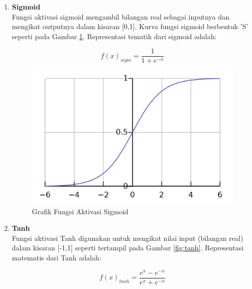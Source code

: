 \begin{enumerate}
	\item \textbf{Sigmoid}\\
	Fungsi aktivasi sigmoid mengambil bilangan real sebagai inputnya dan mengikat outputnya dalam kisaran [0,1]. Kurva fungsi sigmoid berbentuk 'S' seperti pada Gambar \ref{fig:sigmoid}. Representasi tematik dari sigmoid adalah:
	
	\begin{equation}
		f(x)_{sigm}=\frac{1}{1+e^{-x}}
	\end{equation}
	
	\begin{figure}[h!]
		\centering
		\includegraphics[scale=0.15]{gambar/sigmoid.png}
		\caption{Grafik Fungsi Aktivasi Sigmoid \citep{sigmoid}}
		\label{fig:sigmoid}
	\end{figure}
	
	\item \textbf{Tanh}\\
	Fungsi aktivasi Tanh digunakan untuk mengikat nilai input (bilangan real) dalam kisaran [-1,1] seperti tertampil pada Gambar \ref{fig:tanh}. Representasi matematis dari Tanh adalah:
	
	\begin{equation}
		f(x)_{tanh}=\frac{e^x-e^{-x}}{e^x+e^{-x}}
	\end{equation}
	

\end{enumerate}

